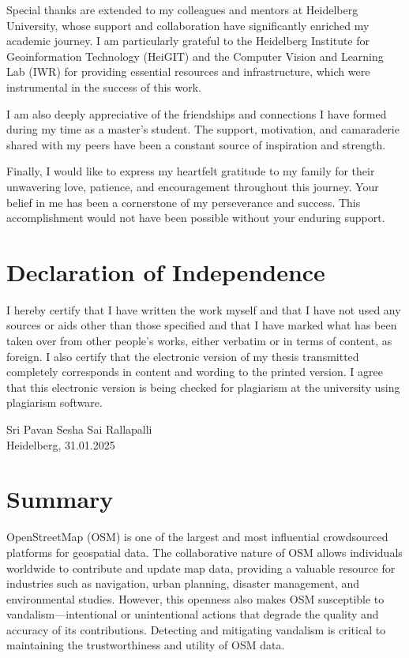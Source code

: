 \documentclass[
    13pt, %
    a4paper, %
    twoside, 
    DIV14, %
    listof=totoc, %
    bibliography=totoc, %
    index=totoc, %
    headsepline
]{scrreprt}
\begin{document}
Special thanks are extended to my colleagues and mentors at Heidelberg University, whose support and collaboration have significantly enriched my academic journey. I am particularly grateful to the Heidelberg Institute for Geoinformation Technology (HeiGIT) and the Computer Vision and Learning Lab (IWR) for providing essential resources and infrastructure, which were instrumental in the success of this work.

I am also deeply appreciative of the friendships and connections I have formed during my time as a master’s student. The support, motivation, and camaraderie shared with my peers have been a constant source of inspiration and strength.

Finally, I would like to express my heartfelt gratitude to my family for their unwavering love, patience, and encouragement throughout this journey. Your belief in me has been a cornerstone of my perseverance and success. This accomplishment would not have been possible without your enduring support.

\newpage
\section*{\LARGE Declaration of Independence}
I hereby certify that I have written the work myself and that I have not used any sources
or aids other than those specified and that I have marked what has been taken over from
other people’s works, either verbatim or in terms of content, as foreign. I also certify
that the electronic version of my thesis transmitted completely corresponds in content
and wording to the printed version. I agree that this electronic version is being checked
for plagiarism at the university using plagiarism software.

\vspace*{50pt}

\noindent
Sri Pavan Sesha Sai Rallapalli\\
Heidelberg, 31.01.2025

\newpage

\section*{\LARGE Summary}

OpenStreetMap (OSM) is one of the largest and most influential crowdsourced platforms for geospatial data. The collaborative nature of OSM allows individuals worldwide to contribute and update map data, providing a valuable resource for industries such as navigation, urban planning, disaster management, and environmental studies. However, this openness also makes OSM susceptible to vandalism—intentional or unintentional actions that degrade the quality and accuracy of its contributions. Detecting and mitigating vandalism is critical to maintaining the trustworthiness and utility of OSM data.
\end{document}
